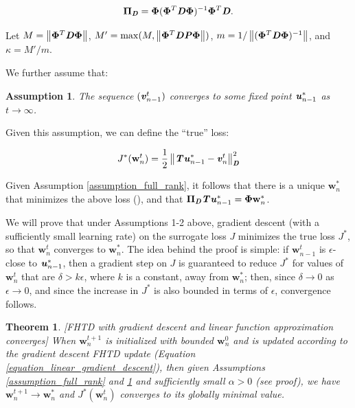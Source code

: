 \documentclass{article}
\renewcommand{\vec}[1]{\textbf{\textit{#1}}}
\newcommand{\val}{\vec{v}}
\newcommand{\valt}{\val}
\newcommand{\target}{\vec{u}}
\newcommand{\params}{\textbf{w}}
\newcommand{\Features}{\bm{\Phi}}
\newcommand{\transitionmtx}{\textbf{\textit{P}}}
\newcommand{\projectionmtx}{\bm{\Pi}}
\newcommand{\densitymtx}{\textbf{\textit{D}}}
\newcommand{\bellmanop}{\textbf{\textit{T}}}
\newcommand{\norm}[1]{\left\lVert #1 \right\rVert}
\newtheorem{theorem}{Theorem}
\newtheorem{assumption}{Assumption}
\begin{document}
\begin{equation}
	\projectionmtx_\densitymtx = \Features(\Features^T\densitymtx\Features)^{-1}\Features^T\densitymtx.
\end{equation}

Let $M = \norm{\Features^T\densitymtx\Features}$, $M' = \max(M, \norm{\Features^T\densitymtx\transitionmtx\Features})$, $m = 1/\norm{(\Features^T\densitymtx\Features)^{-1}}$, and $\kappa = M'/m$.

We further assume that:

\begin{assumption}\label{assumption_converging_target}
	The sequence $(\valt_{n-1}^t)$ converges to some fixed point $\target^*_{n-1}$ as $t \to \infty$.
\end{assumption}

Given this assumption, we can define the ``true'' loss:

\begin{equation}
	J^*(\params_n^t) = \frac{1}{2}\norm{\bellmanop\target^*_{n-1} - \valt_n^t}_\densitymtx^2
\end{equation}

Given Assumption \ref{assumption_full_rank}, it follows that there is a unique $\params_n^*$ that minimizes the above loss (\cite{tsitsiklis1997analysis}), and that $\projectionmtx_\densitymtx\bellmanop\target^*_{n-1} = \Features\params_n^*$.

We will prove that under Assumptions 1-2 above, gradient descent (with a sufficiently small learning rate) on the surrogate loss $J$ minimizes the true loss $J^*$, so that $\params_n^t$ converges to $\params_n^*$. The idea behind the proof is simple: if $\params_{n-1}^t$ is $\epsilon$-close to $\target^*_{n-1}$, then a gradient step on $J$ is guaranteed to reduce $J^*$ for values of $\params_n^t$ that are $\delta > k\epsilon$, where $k$ is a constant, away from $\params_n^*$; then, since $\delta \to 0$ as $\epsilon \to 0$, and since the increase in $J^*$ is also bounded in terms of $\epsilon$, convergence follows.

\begin{theorem}\label{theorem_linear_convergence}
[FHTD with gradient descent and linear function approximation converges]
When $\params_n^{t+1}$ is initialized with bounded $\params_n^0$ and is updated according to the gradient descent FHTD update (Equation \ref{equation_linear_gradient_descent}), then given Assumptions \ref{assumption_full_rank} and \ref{assumption_converging_target} and sufficiently small $\alpha > 0$ (see proof), we have $\params_n^{t+1} \to \params_n^*$ and $J^*(\params_n^t)$ converges to its globally minimal value.
\end{theorem}
\end{document}
